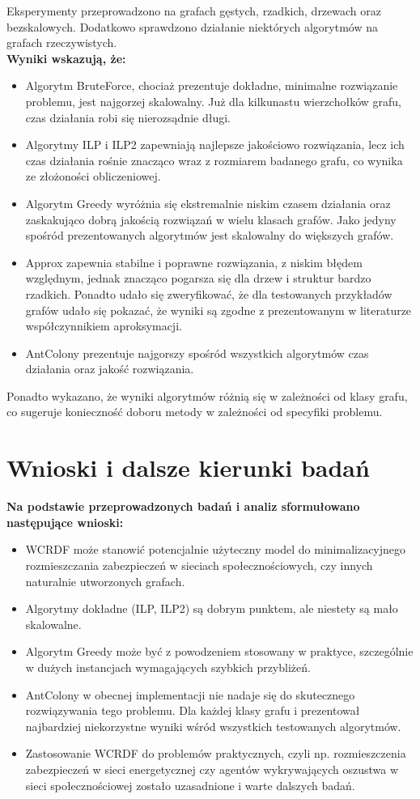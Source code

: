 Eksperymenty przeprowadzono na grafach gęstych, rzadkich, drzewach oraz bezskalowych. Dodatkowo sprawdzono działanie niektórych algorytmów na grafach rzeczywistych. \\
\textbf{Wyniki wskazują, że:}
\begin{itemize}
    \item Algorytm BruteForce, chociaż prezentuje dokładne, minimalne rozwiązanie problemu, jest najgorzej skalowalny. Już dla kilkunastu wierzchołków grafu, czas działania robi się nierozsądnie długi.
    \item Algorytmy ILP i ILP2 zapewniają najlepsze jakościowo rozwiązania, lecz ich czas działania rośnie znacząco wraz z rozmiarem badanego grafu, co wynika ze złożoności obliczeniowej.
    \item Algorytm Greedy wyróżnia się ekstremalnie niskim czasem działania oraz zaskakująco dobrą jakością rozwiązań w wielu klasach grafów. Jako jedyny spośród prezentowanych algorytmów jest skalowalny do większych grafów.
    \item Approx zapewnia stabilne i poprawne rozwiązania, z niskim błędem względnym, jednak znacząco pogarsza się dla drzew i struktur bardzo rzadkich. Ponadto udało się zweryfikować, że dla testowanych przykładów grafów udało się pokazać, że wyniki są zgodne z prezentowanym w literaturze współczynnikiem aproksymacji.
    \item AntColony prezentuje najgorszy spośród wszystkich algorytmów czas działania oraz jakość rozwiązania.
\end{itemize}

Ponadto wykazano, że wyniki algorytmów różnią się w zależności od klasy grafu, co sugeruje konieczność doboru metody w zależności od specyfiki problemu.

\section{Wnioski i dalsze kierunki badań}

\textbf{Na podstawie przeprowadzonych badań i analiz sformułowano następujące wnioski:}
\begin{itemize}
    \item WCRDF może stanowić potencjalnie użyteczny model do minimalizacyjnego rozmieszczania zabezpieczeń w sieciach społecznościowych, czy innych naturalnie utworzonych grafach.
    \item Algorytmy dokładne (ILP, ILP2) są dobrym punktem, ale niestety są mało skalowalne.
    \item Algorytm Greedy może być z powodzeniem stosowany w praktyce, szczególnie w dużych instancjach wymagających szybkich przybliżeń.
    \item AntColony w obecnej implementacji nie nadaje się do skutecznego rozwiązywania tego problemu. Dla każdej klasy grafu i prezentował najbardziej niekorzystne wyniki wśród wszystkich testowanych algorytmów.
    \item Zastosowanie WCRDF do problemów praktycznych, czyli np. rozmieszczenia zabezpieczeń w sieci energetycznej czy agentów wykrywających oszustwa w sieci społecznościowej zostało uzasadnione i warte dalszych badań.
\end{itemize}

